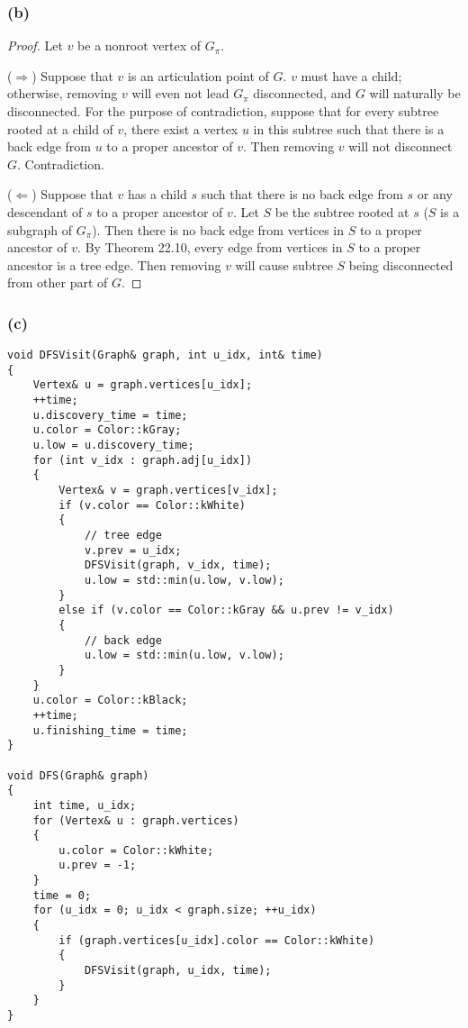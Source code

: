 \subsubsection*{(b)}

\begin{proof}
    Let $v$ be a nonroot vertex of $G_\pi$.
    
    ($\Longrightarrow$)
    Suppose that $v$ is an articulation point of $G$.
    $v$ must have a child; 
    otherwise, removing $v$ will even not lead $G_\pi$ disconnected,
    and $G$ will naturally be disconnected.
    For the purpose of contradiction,
    suppose that for every subtree rooted at a child of $v$,
    there exist a vertex $u$ in this subtree such that 
    there is a back edge from $u$ to a proper ancestor of $v$.
    Then removing $v$ will not disconnect $G$.
    Contradiction.

    ($\Longleftarrow$)
    Suppose that $v$ has a child $s$ such that
    there is no back edge from $s$ or any descendant of $s$
    to a proper ancestor of $v$.
    Let $S$ be the subtree rooted at $s$ 
    ($S$ is a subgraph of $G_\pi$).
    Then there is no back edge from vertices in $S$ 
    to a proper ancestor of $v$.
    By Theorem 22.10,
    every edge from vertices in $S$ to a proper ancestor is a tree edge.
    Then removing $v$ will cause subtree $S$ being disconnected
    from other part of $G$.
\end{proof}

\subsubsection*{(c)}

\begin{verbatim}
void DFSVisit(Graph& graph, int u_idx, int& time)
{
    Vertex& u = graph.vertices[u_idx];
    ++time;
    u.discovery_time = time;
    u.color = Color::kGray;
    u.low = u.discovery_time;
    for (int v_idx : graph.adj[u_idx])
    {
        Vertex& v = graph.vertices[v_idx];
        if (v.color == Color::kWhite)
        {
            // tree edge
            v.prev = u_idx;
            DFSVisit(graph, v_idx, time);
            u.low = std::min(u.low, v.low);
        }
        else if (v.color == Color::kGray && u.prev != v_idx)
        {
            // back edge
            u.low = std::min(u.low, v.low);
        }
    }
    u.color = Color::kBlack;
    ++time;
    u.finishing_time = time;
}

void DFS(Graph& graph)
{
    int time, u_idx;
    for (Vertex& u : graph.vertices)
    {
        u.color = Color::kWhite;
        u.prev = -1;
    }
    time = 0;
    for (u_idx = 0; u_idx < graph.size; ++u_idx)
    {
        if (graph.vertices[u_idx].color == Color::kWhite)
        {
            DFSVisit(graph, u_idx, time);
        }
    }
}
\end{verbatim}

